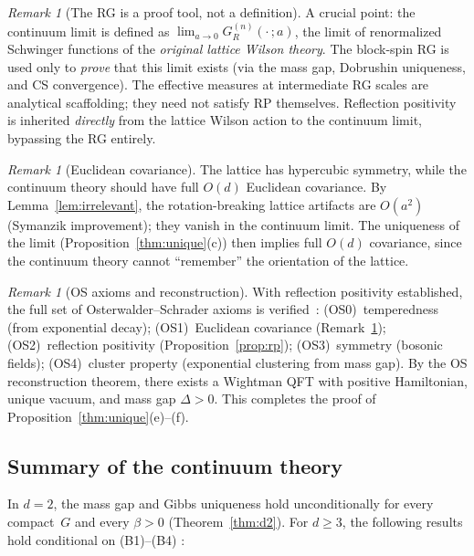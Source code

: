 \documentclass[11pt,a4paper]{article}
\theoremstyle{plain}
\theoremstyle{definition}
\theoremstyle{remark}
\newtheorem{remark}[theorem]{Remark}
\begin{document}
\begin{remark}[The RG is a proof tool, not a definition]
\label{rem:rg_tool}
A crucial point: the continuum limit is defined as
$\lim_{a \to 0} G_R^{(n)}(\cdot\,;a)$, the limit
of renormalized Schwinger functions of the
\emph{original lattice Wilson theory}.  The block-spin RG
is used only to \emph{prove} that this limit exists
(via the mass gap, Dobrushin uniqueness, and CS
convergence).  The effective measures at intermediate RG
scales are analytical scaffolding; they need not satisfy
RP themselves.  Reflection positivity is inherited
\emph{directly} from the lattice Wilson action to the
continuum limit, bypassing the RG entirely.
\end{remark}

\begin{remark}[Euclidean covariance]
\label{rem:euclidean}
The lattice has hypercubic symmetry, while the continuum
theory should have full $O(d)$ Euclidean covariance.
By Lemma~\ref{lem:irrelevant}, the rotation-breaking
lattice artifacts are $O(a^2)$ (Symanzik improvement);
they vanish in the continuum limit.  The uniqueness of
the limit (Proposition~\ref{thm:unique}(c)) then implies
full $O(d)$ covariance, since the continuum theory cannot
``remember'' the orientation of the lattice.
\end{remark}

\begin{remark}[OS axioms and reconstruction]
\label{rem:os}
With reflection positivity established, the full set of
Osterwalder--Schrader axioms is
verified~\cite{OsterwalderSchrader}:
\textup{(OS0)}~temperedness (from exponential decay);
\textup{(OS1)}~Euclidean covariance (Remark~\ref{rem:euclidean});
\textup{(OS2)}~reflection positivity (Proposition~\ref{prop:rp});
\textup{(OS3)}~symmetry (bosonic fields);
\textup{(OS4)}~cluster property (exponential clustering from
mass gap).
By the OS reconstruction theorem, there exists a
Wightman QFT with positive Hamiltonian, unique vacuum, and
mass gap $\Delta > 0$.  This completes the proof of
Proposition~\ref{thm:unique}(e)--(f).
\end{remark}

\subsection{Summary of the continuum theory}

In $d = 2$, the mass gap and Gibbs uniqueness hold
unconditionally for every compact~$G$ and every
$\beta > 0$ (Theorem~\ref{thm:d2}).  For $d \geq 3$,
the following results hold conditional on
(B1)--(B4) \cite{FontesSU2}:
\end{document}

